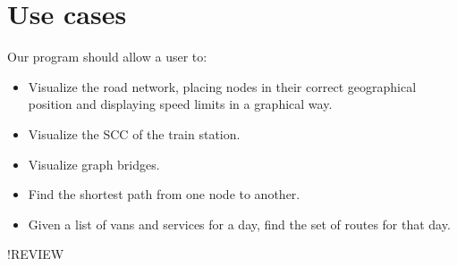 \chapter{Use cases} \label{use-cases}
Our program should allow a user to:
\begin{itemize}
    \item Visualize the road network, placing nodes in their correct geographical position and displaying speed limits in a graphical way.
    \item Visualize the SCC of the train station.
    \item Visualize graph bridges.
    \item Find the shortest path from one node to another.
    \item Given a list of vans and services for a day, find the set of routes for that day.
\end{itemize}
!REVIEW
